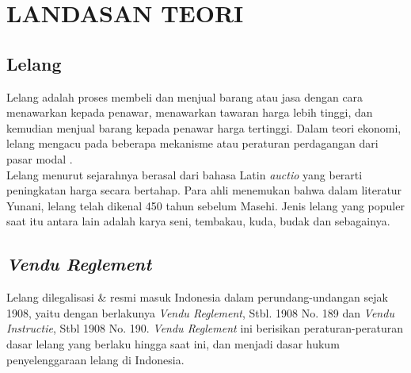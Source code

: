 \chapter{LANDASAN TEORI}

  \section{Lelang}
  Lelang adalah proses membeli dan menjual barang atau jasa dengan cara menawarkan kepada penawar, menawarkan tawaran harga lebih tinggi, dan kemudian menjual barang kepada penawar harga tertinggi. Dalam teori ekonomi, lelang mengacu pada beberapa mekanisme atau peraturan perdagangan dari pasar modal \cite{balailelang_sejarah_nodate}.
  \\ \indent
  Lelang menurut sejarahnya berasal dari bahasa Latin \textit{auctio} yang berarti peningkatan harga secara bertahap. Para ahli menemukan bahwa dalam literatur Yunani, lelang telah dikenal 450 tahun sebelum Masehi. Jenis lelang yang populer saat itu antara lain adalah karya seni, tembakau, kuda, budak dan sebagainya\cite{pratama_lelang_2012}.
  
  
  \section{\textit{Vendu Reglement}}
  Lelang dilegalisasi \& resmi masuk Indonesia dalam perundang-undangan sejak 1908, yaitu dengan berlakunya \textit{Vendu Reglement}, Stbl. 1908 No. 189 dan \textit{Vendu Instructie}, Stbl 1908 No. 190. \textit{Vendu Reglement} ini berisikan peraturan-peraturan dasar lelang yang berlaku hingga saat ini, dan menjadi dasar hukum penyelenggaraan lelang di Indonesia\cite{balailelang_sejarah_nodate}.
  
 
